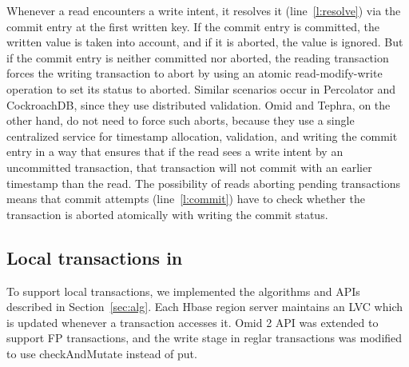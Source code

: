 Whenever a read encounters a write intent, it resolves it (line~\ref{l:resolve}) via the commit entry at the first written key. 
If the commit entry is committed, the written value is taken into account, and if it is aborted, the value is ignored. 
But if the commit entry is neither committed nor aborted, the reading transaction forces the writing transaction to abort by using 
an atomic read-modify-write operation to set its status to aborted. Similar scenarios occur in Percolator and CockroachDB, since 
they use distributed validation. Omid and Tephra, on the other hand, do not need to force such aborts, because they use a single centralized service for timestamp allocation, validation, and writing the commit entry in a way that ensures that  if the read sees a write intent by an uncommitted transaction, that transaction will not commit with an earlier timestamp than the read.
%
The possibility of reads aborting pending transactions means that commit attempts (line~\ref{l:commit}) have to  
check whether the transaction is aborted atomically with writing the commit status.


\subsection{Local transactions in \sys}
\label{ssec:fp-impl}
To support local transactions, we implemented the algorithms and APIs described in Section~\ref{sec:alg}. Each Hbase region server maintains an LVC which is updated whenever a transaction accesses it. Omid 2 API was extended to support FP transactions, and the write stage in reglar transactions was modified to use checkAndMutate instead of put. 



